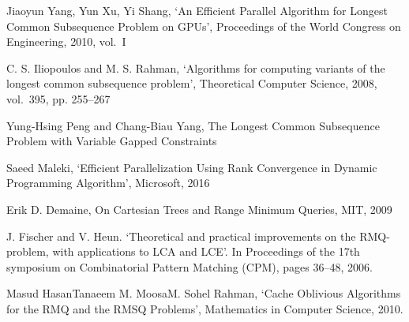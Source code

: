 \documentclass{gapd}
\begin{document}
\begin{thebibliography}{4}

 Jiaoyun Yang, Yun Xu, Yi Shang, `An Efficient Parallel Algorithm for Longest Common Subsequence Problem on GPUs', Proceedings of the World Congress on Engineering, 2010, vol.~I 

 C. S. Iliopoulos and M. S. Rahman, `Algorithms for computing variants of the longest common subsequence problem', Theoretical Computer Science, 2008, vol.~395, pp. 255--267

 Yung-Hsing Peng and Chang-Biau Yang, The Longest Common Subsequence Problem with Variable Gapped Constraints

 Saeed Maleki, `Efficient Parallelization Using Rank Convergence in Dynamic Programming Algorithm', Microsoft, 2016

 Erik D. Demaine, On Cartesian Trees and Range Minimum Queries, MIT, 2009

 J. Fischer and V. Heun. `Theoretical and practical improvements on the RMQ-problem, with applications to LCA and LCE'. In Proceedings of the 17th symposium on Combinatorial Pattern Matching (CPM), pages 36–48, 2006.

 Masud HasanTanaeem M. MoosaM. Sohel Rahman, `Cache Oblivious Algorithms for the RMQ and the RMSQ Problems', Mathematics in Computer Science, 2010.

\end{thebibliography}
\end{document}

